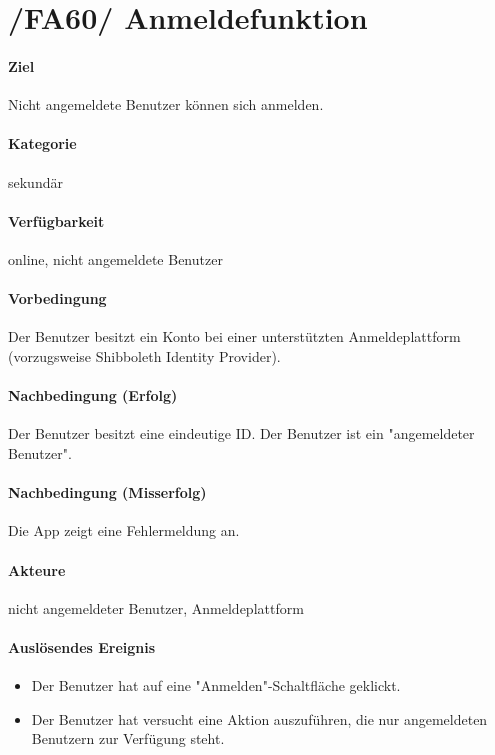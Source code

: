 \section{/FA60/ Anmeldefunktion}
\label{Anmeldefunktion}
\label{/FA60/}
\paragraph{Ziel}
Nicht angemeldete Benutzer können sich anmelden.
\paragraph{Kategorie}
sekundär
\paragraph{Verfügbarkeit}
online, nicht angemeldete Benutzer
\paragraph{Vorbedingung}
Der Benutzer besitzt ein Konto bei einer unterstützten Anmeldeplattform (vorzugsweise Shibboleth Identity Provider).
\paragraph{Nachbedingung (Erfolg)}
Der Benutzer besitzt eine eindeutige ID. Der Benutzer ist ein "angemeldeter Benutzer".
\paragraph{Nachbedingung (Misserfolg)}
Die App zeigt eine Fehlermeldung an.
\paragraph{Akteure}
nicht angemeldeter Benutzer, Anmeldeplattform
\paragraph{Auslösendes Ereignis}
\begin{itemize}
      \item Der Benutzer hat auf eine "Anmelden"-Schaltfläche geklickt.
      \item Der Benutzer hat versucht eine Aktion auszuführen, die nur angemeldeten Benutzern zur Verfügung steht.
\end{itemize}
